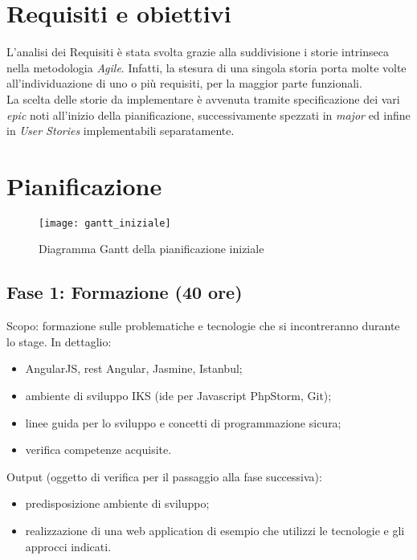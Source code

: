 \section{Requisiti e obiettivi}
L'analisi dei Requisiti è stata svolta grazie alla suddivisione i storie intrinseca nella metodologia \emph{Agile}. Infatti, la stesura di una singola storia porta molte volte all'individuazione di uno o più requisiti, per la maggior parte funzionali.\\
La scelta delle storie da implementare è avvenuta tramite specificazione dei vari \emph{epic} noti all'inizio della pianificazione, successivamente spezzati in \emph{major} ed infine in \emph{User Stories} implementabili separatamente.

\section{Pianificazione}

\begin{figure}[H] 
    \centering 
    \texttt{[image: gantt\_iniziale]} 
    \caption{Diagramma Gantt della pianificazione iniziale}
\end{figure}

\subsection{Fase 1: Formazione (40 ore)}
Scopo: formazione sulle problematiche e tecnologie che si incontreranno durante lo stage.
In dettaglio:
\begin{itemize}
	\item AngularJS, \gls{rest} Angular, Jasmine, Istanbul;
	\item ambiente di sviluppo IKS (\gls{ide} per Javascript PhpStorm, Git);
	\item linee guida per lo sviluppo e concetti di programmazione sicura;
	\item verifica competenze acquisite.
\end{itemize}
Output (oggetto di verifica per il passaggio alla fase successiva):
\begin{itemize}
	\item predisposizione ambiente di sviluppo;
	\item realizzazione di una web application di esempio che utilizzi le tecnologie e gli approcci
indicati.
\end{itemize}

